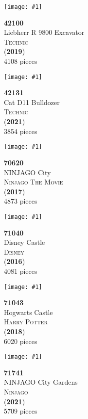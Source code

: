 \documentclass[letterpaper]{article}%
\newenvironment{legocell}[1]
{
	\begin{minipage}[c][2.0in][c]{4in}
	\centering
	\varwidth{3.6in}
	\raggedright %
	\begin{minipage}[c]{1.3in}
		\texttt{[image: \#1]}
	\end{minipage}
	\begin{minipage}[c]{2.2in}
	\raggedright
}
{
	\end{minipage}
	\endvarwidth
	\end{minipage}
	\allowbreak
	\ignorespaces
}
\begin{document}
\begin{legocell}{images/set_42100-1.jpg}
\textbf{42100}\\
{\sffamily\large Liebherr R 9800 Excavator}\\
\textsc{\color{DarkBlue}\normalsize Technic}\\
(\textbf{2019})\\
{\normalsize 4108 pieces}\\
\end{legocell}
\begin{legocell}{images/set_42131-1.jpg}
\textbf{42131}\\
{\sffamily\large Cat D11 Bulldozer}\\
\textsc{\color{DarkBlue}\normalsize Technic}\\
(\textbf{2021})\\
{\normalsize 3854 pieces}\\
\end{legocell}
\begin{legocell}{images/set_70620-1.jpg}
\textbf{70620}\\
{\sffamily\large NINJAGO City}\\
\textsc{\color{DarkBlue}\normalsize Ninjago The Movie}\\
(\textbf{2017})\\
{\normalsize 4873 pieces}\\
\end{legocell}
\begin{legocell}{images/set_71040-1.jpg}
\textbf{71040}\\
{\sffamily\large Disney Castle}\\
\textsc{\color{DarkBlue}\normalsize Disney}\\
(\textbf{2016})\\
{\normalsize 4081 pieces}\\
\end{legocell}
\begin{legocell}{images/set_71043-1.jpg}
\textbf{71043}\\
{\sffamily\large Hogwarts Castle}\\
\textsc{\color{DarkBlue}\normalsize Harry Potter}\\
(\textbf{2018})\\
{\normalsize 6020 pieces}\\
\end{legocell}
\begin{legocell}{images/set_71741-1.jpg}
\textbf{71741}\\
{\sffamily\large NINJAGO City Gardens}\\
\textsc{\color{DarkBlue}\normalsize Ninjago}\\
(\textbf{2021})\\
{\normalsize 5709 pieces}\\
\end{legocell}
\end{document}
